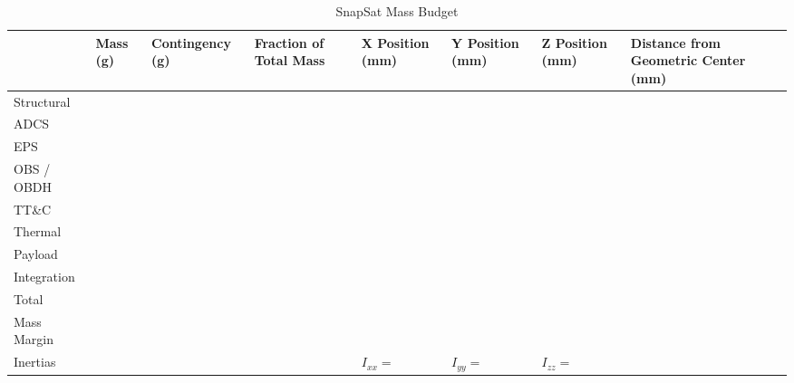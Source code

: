\begin{landscape}
\begin{table}[H]
    \centering
    \caption{SnapSat Mass Budget}
    \vspace{0.15cm}
    \label{tab:massbudget}
    {\renewcommand{\arraystretch}{1.4}%
    \begin{tabular}{|>{\arraybackslash}m{3cm}||>{\arraybackslash}m{2cm}|>{\arraybackslash}m{2.3cm}|>{\arraybackslash}m{2cm}|>{\arraybackslash}m{2cm}|>{\arraybackslash}m{2cm}|>{\arraybackslash}m{2cm}|>{\arraybackslash}m{2.5cm}|}
            \hline
            {\bf Subsystem} & {\bf Mass (g)} & {\bf Contingency (g)} & {\bf Fraction of Total Mass} & {\bf X Position (mm)} & {\bf Y Position (mm)} & {\bf Z Position (mm)} & {\bf Distance from Geometric Center (mm)} \\ \hline\hline
            Structural &  &  &  &  &  &  &  \\ \hline
            ADCS &  &  &  &  &  &  &  \\ \hline
            EPS &  &  &  &  &  &  &  \\ \hline
            OBS / OBDH &  &  &  &  &  &  &  \\ \hline
            TT\&C &  &  &  &  &  &  &  \\ \hline
            Thermal &  &  &  &  &  &  &  \\ \hline
            Payload &  &  &  &  &  &  &  \\ \hline
            Integration &  &  &  &  &  &  &  \\ \hline
            Total &  &  &  &  &  &  &  \\ \hline
            Mass Margin &  &  &  &  &  &  &  \\ \hline
            Inertias &  &  &  & $I_{xx}=$ & $I_{yy}=$ & $I_{zz}=$ &  \\ \hline
    \end{tabular} } 
\end{table} \vspace{0.3cm}
\end{landscape}


